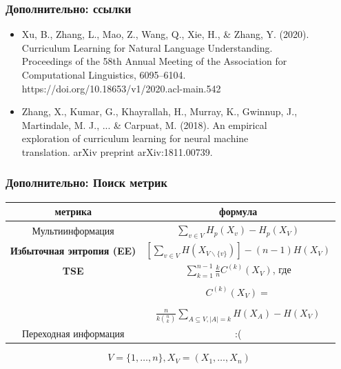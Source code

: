 \documentclass{beamer}
\begin{document}
\begin{frame}[label=supplemental,noframenumbering]
	\frametitle{Дополнительно: ссылки}
	\begin{itemize}
		\item Xu, B., Zhang, L., Mao, Z., Wang, Q., Xie, H., \& Zhang, Y. (2020). \\\hspace{1cm}Curriculum Learning for
		Natural Language Understanding. \\\hspace{1cm}Proceedings of the 58th Annual Meeting of the
		Association for \\\hspace{1cm}Computational Linguistics, 6095–6104.
		\\\hspace{1cm}https://doi.org/10.18653/v1/2020.acl-main.542
		\item Zhang, X., Kumar, G., Khayrallah, H., Murray, K., Gwinnup, J., \\\hspace{1cm}Martindale, M. J., ... \&
		Carpuat, M. (2018). An empirical \\\hspace{1cm}exploration of curriculum learning for neural
		machine \\\hspace{1cm}translation. arXiv preprint arXiv:1811.00739.
	\end{itemize}
\end{frame}

\begin{frame}[label=supplemental,noframenumbering]
	\frametitle{Дополнительно: Поиск метрик}
	\let\thefootnote\relax{}
	
	\begin{table}
		\begin{tabular}{c|c}
			\hline
			метрика & формула \\
			\hline
			Мультиинформация & $\sum\limits_{v\in V}H_p(X_v) - H_p(X_V)$ \\
			\hline
			{\bf Избыточная энтропия (EE)} & $\left[\sum\limits_{v\in V}H(X_{V\backslash\{v\}})\right] - (n - 1)H(X_V)$ \\
			\hline
			{\bf TSE} & $\sum\limits_{k=1}^{n-1}\frac{k}{n}C^{(k)}(X_V)$, где \\\\
			& $C^{(k)}(X_V) =$ \\\\
			& $\frac{n}{k\binom{n}{k}}\sum\limits_{A\subseteq V,|A|=k}H(X_A) - H(X_V)$ \\
			\hline
			Переходная информация & :( \\
			\hline
		\end{tabular}
	\end{table}
	
	\[
	V=\{1,\ldots,n\},
	X_V = (X_1,\ldots,X_n)
	\]
\end{frame}
\end{document}
